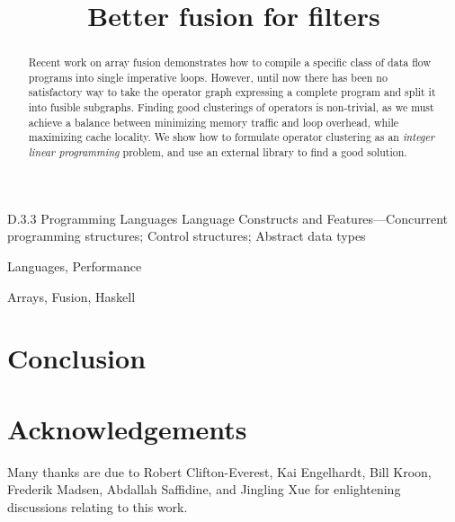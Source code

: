 \documentclass[preprint]{sigplanconf}
\begin{document}
\title{Better fusion for filters}

\maketitle
\makeatactive

\begin{abstract}
Recent work on array fusion demonstrates how to compile a specific class of data flow programs into single imperative loops.
However, until now there has been no satisfactory way to take the operator graph expressing a complete program and split it into fusible subgraphs.
Finding good clusterings of operators is non-trivial, as we must achieve a balance between minimizing memory traffic and loop overhead, while maximizing cache locality.
We show how to formulate operator clustering as an \emph{integer linear programming} problem, and use an external library to find a good solution. 
\end{abstract}



\category
	{D.3.3}
	{Programming Languages}
	{Language Constructs and Features---Concurrent programming structures; Control structures; Abstract data types}

\terms
	Languages, Performance

\keywords
	Arrays, Fusion, Haskell







\section{Conclusion}

\section*{Acknowledgements}
Many thanks are due to
Robert Clifton-Everest,
Kai Engelhardt,
Bill Kroon,
Frederik Madsen,
Abdallah Saffidine,
and Jingling Xue
for enlightening discussions relating to this work.



\end{document}
